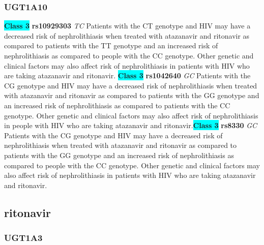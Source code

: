 \documentclass{book}
\begin{document}
\subsubsection{ UGT1A10 }

\begin{center}
\textbf{\colorbox{cyan} {Class 3}} \textbf{ rs10929303 } \textit{ TC }
Patients with the CT genotype and HIV may have a decreased risk of nephrolithiasis when treated with atazanavir and ritonavir as compared to patients with the TT genotype and an increased risk of nephrolithiasis as compared to people with the CC genotype. Other genetic and clinical factors may also affect risk of nephrolithiasis in patients with HIV who are taking atazanavir and ritonavir. \textbf{\colorbox{cyan} {Class 3}} \textbf{ rs1042640 } \textit{ GC }
Patients with the CG genotype and HIV may have a decreased risk of nephrolithiasis when treated with atazanavir and ritonavir as compared to patients with the GG genotype and an increased risk of nephrolithiasis as compared to patients with the CC genotype. Other genetic and clinical factors may also affect risk of nephrolithiasis in people with HIV who are taking atazanavir and ritonavir.\textbf{\colorbox{cyan} {Class 3}} \textbf{ rs8330 } \textit{ GC }
Patients with the CG genotype and HIV may have a decreased risk of nephrolithiasis when treated with atazanavir and ritonavir as compared to patients with the GG genotype and an increased risk of nephrolithiasis as compared to people with the CC genotype. Other genetic and clinical factors may also affect risk of nephrolithiasis in patients with HIV who are taking atazanavir and ritonavir.


\end{center}\subsection{ ritonavir }


\subsubsection{ UGT1A3 }
\end{document}
